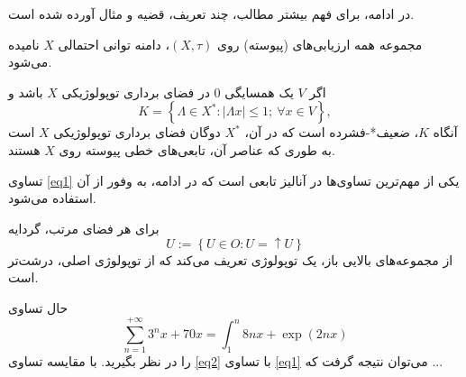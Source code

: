 در ادامه، برای فهم بیشتر مطالب، چند تعریف، قضیه و مثال آورده شده است. 
\begin{definition}
مجموعه همه ارزیابی‌های  (پیوسته)  روی $(X,\tau)$، دامنه توانی احتمالی
$ X $
نامیده می‌شود.
\end{definition}
\begin{theorem}
اگر $ V $ یک همسایگی $ 0 $ در فضای برداری 
 توپولوژیکی $ X $ باشد و 
\begin{equation}\label{eq1}
K=\left\lbrace \Lambda \in X^{*}:|\Lambda x|\leqslant 1 ; \ \forall x\in V\right\rbrace,
\end{equation}
آنگاه $ K $،  ضعیف*-فشرده است که در آن، $ X^{*} $ دوگان
 فضای برداری توپولوژیکی $ X $ است به ‌طوری که عناصر آن،  تابعی‌های 
خطی پیوسته
 روی $X$ هستند.
\end{theorem}
تساوی \eqref{eq1} یکی از مهم‌ترین تساوی‌ها در آنالیز تابعی است که در ادامه، به وفور از آن استفاده می‌شود.
\begin{example}
برای هر فضای مرتب، گردایه 
$$U:=\left\lbrace U\in O: U=\uparrow U\right\rbrace $$
از مجموعه‌های بالایی باز، یک توپولوژی تعریف می‌کند که از توپولوژی اصلی، درشت‌تر  است.
\end{example}
حال تساوی 
\begin{equation}\label{eq2}
\sum_{n=1}^{+\infty} 3^{n}x+70x=\int_{1}^{n}8nx+\exp{(2nx)}
\end{equation}
را در نظر بگیرید. با مقایسه تساوی \eqref{eq2} با تساوی \eqref{eq1} می‌توان نتیجه گرفت که ...
